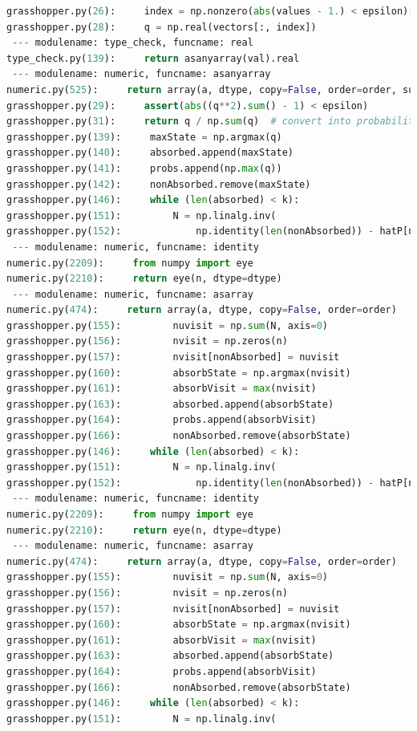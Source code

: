 \documentclass[10pt]{article}
\begin{document}
\begin{lstlisting}[breaklines,language=Python]
grasshopper.py(26):     index = np.nonzero(abs(values - 1.) < epsilon)[0][0]
grasshopper.py(28):     q = np.real(vectors[:, index])
 --- modulename: type_check, funcname: real
type_check.py(139):     return asanyarray(val).real
 --- modulename: numeric, funcname: asanyarray
numeric.py(525):     return array(a, dtype, copy=False, order=order, subok=True)
grasshopper.py(29):     assert(abs((q**2).sum() - 1) < epsilon)
grasshopper.py(31):     return q / np.sum(q)  # convert into probability distribution
grasshopper.py(139):     maxState = np.argmax(q)
grasshopper.py(140):     absorbed.append(maxState)
grasshopper.py(141):     probs.append(np.max(q))
grasshopper.py(142):     nonAbsorbed.remove(maxState)
grasshopper.py(146):     while (len(absorbed) < k):
grasshopper.py(151):         N = np.linalg.inv(
grasshopper.py(152):             np.identity(len(nonAbsorbed)) - hatP[nonAbsorbed, nonAbsorbed])
 --- modulename: numeric, funcname: identity
numeric.py(2209):     from numpy import eye
numeric.py(2210):     return eye(n, dtype=dtype)
 --- modulename: numeric, funcname: asarray
numeric.py(474):     return array(a, dtype, copy=False, order=order)
grasshopper.py(155):         nuvisit = np.sum(N, axis=0)
grasshopper.py(156):         nvisit = np.zeros(n)
grasshopper.py(157):         nvisit[nonAbsorbed] = nuvisit
grasshopper.py(160):         absorbState = np.argmax(nvisit)
grasshopper.py(161):         absorbVisit = max(nvisit)
grasshopper.py(163):         absorbed.append(absorbState)
grasshopper.py(164):         probs.append(absorbVisit)
grasshopper.py(166):         nonAbsorbed.remove(absorbState)
grasshopper.py(146):     while (len(absorbed) < k):
grasshopper.py(151):         N = np.linalg.inv(
grasshopper.py(152):             np.identity(len(nonAbsorbed)) - hatP[nonAbsorbed, nonAbsorbed])
 --- modulename: numeric, funcname: identity
numeric.py(2209):     from numpy import eye
numeric.py(2210):     return eye(n, dtype=dtype)
 --- modulename: numeric, funcname: asarray
numeric.py(474):     return array(a, dtype, copy=False, order=order)
grasshopper.py(155):         nuvisit = np.sum(N, axis=0)
grasshopper.py(156):         nvisit = np.zeros(n)
grasshopper.py(157):         nvisit[nonAbsorbed] = nuvisit
grasshopper.py(160):         absorbState = np.argmax(nvisit)
grasshopper.py(161):         absorbVisit = max(nvisit)
grasshopper.py(163):         absorbed.append(absorbState)
grasshopper.py(164):         probs.append(absorbVisit)
grasshopper.py(166):         nonAbsorbed.remove(absorbState)
grasshopper.py(146):     while (len(absorbed) < k):
grasshopper.py(151):         N = np.linalg.inv(

\end{lstlisting}
\end{document}
